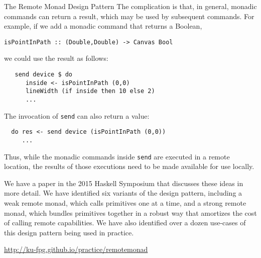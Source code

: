 \begin{hcarentry}{The Remote Monad Design Pattern}
The complication is that, in general, monadic commands can return a
result, which may be used by subsequent commands.  For example, if we
add a monadic command that returns a Boolean,

\begin{verbatim}
isPointInPath :: (Double,Double) -> Canvas Bool
\end{verbatim}

we could use the result as follows:

\begin{verbatim}
   send device $ do
      inside <- isPointInPath (0,0)
      lineWidth (if inside then 10 else 2)
      ...
\end{verbatim}

The invocation of \verb`send` can also return a value:

\begin{verbatim}
  do res <- send device (isPointInPath (0,0))
     ...
\end{verbatim}

Thus, while the monadic commands inside \verb`send` are executed in a
remote location, the results of those executions need to be made
available for use locally. 

We have a paper in the 2015 Haskell Symposium that discusses these ideas in more detail.
We have identified six variants of the design pattern, including
a weak remote monad, which calls primitives one at a time, and
a strong remote monad, which bundles primitives together in a robust way that
amortizes the cost of calling remote capabilities.
We have also identified over a dozen use-cases of this design pattern being used in practice. 

\FurtherReading
\begin{compactitem}
\item
  \url{http://ku-fpg.github.io/practice/remotemonad}
\end{compactitem}
\end{hcarentry}

